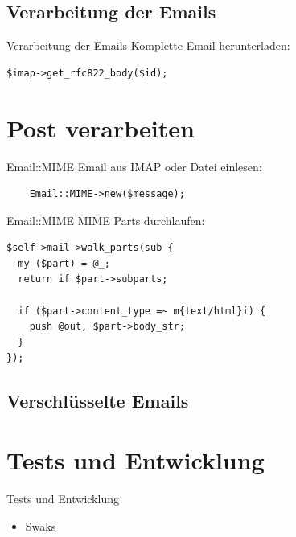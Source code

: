 \subsection{Verarbeitung der Emails}

\begin{frame}[fragile]{Verarbeitung der Emails}
  Komplette Email herunterladen:

\begin{verbatim}
$imap->get_rfc822_body($id);
\end{verbatim}
\end{frame}

\section{Post verarbeiten}

\begin{frame}[fragile]{Email::MIME}
  Email aus IMAP oder Datei einlesen:

  \begin{verbatim}
    Email::MIME->new($message);
  \end{verbatim}

\end{frame}

\begin{frame}[fragile]{Email::MIME}
MIME Parts durchlaufen:

\begin{verbatim}
$self->mail->walk_parts(sub {
  my ($part) = @_;
  return if $part->subparts;

  if ($part->content_type =~ m{text/html}i) {
    push @out, $part->body_str;
  }
});
\end{verbatim}
\end{frame}

\subsection{Verschlüsselte Emails}

\section{Tests und Entwicklung}

\begin{frame}{Tests und Entwicklung}
  \begin{itemize}
  \item Swaks
  \end{itemize}
\end{frame}

